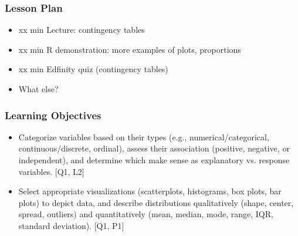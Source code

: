 \begin{frame}
    \frametitle{Lesson Plan}
    \begin{itemize}
        \item xx min Lecture: contingency tables
        \item xx min R demonstration: more examples of plots, proportions
        \item xx min Edfinity quiz (contingency tables)
        \item What else? %
    \end{itemize}
\end{frame}

\begin{frame}
    \frametitle{Learning Objectives}
    \begin{itemize}
        \item Categorize variables based on their types (e.g., numerical/categorical, continuous/discrete, ordinal), assess their association (positive, negative, or independent), and determine which make sense as explanatory vs. response variables. [Q1, L2]
        \item Select appropriate visualizations (scatterplots, histograms, box plots, bar plots) to depict data, and describe distributions qualitatively (shape, center, spread, outliers) and quantitatively (mean, median, mode, range, IQR, standard deviation). [Q1, P1] 
    \end{itemize}
\end{frame}